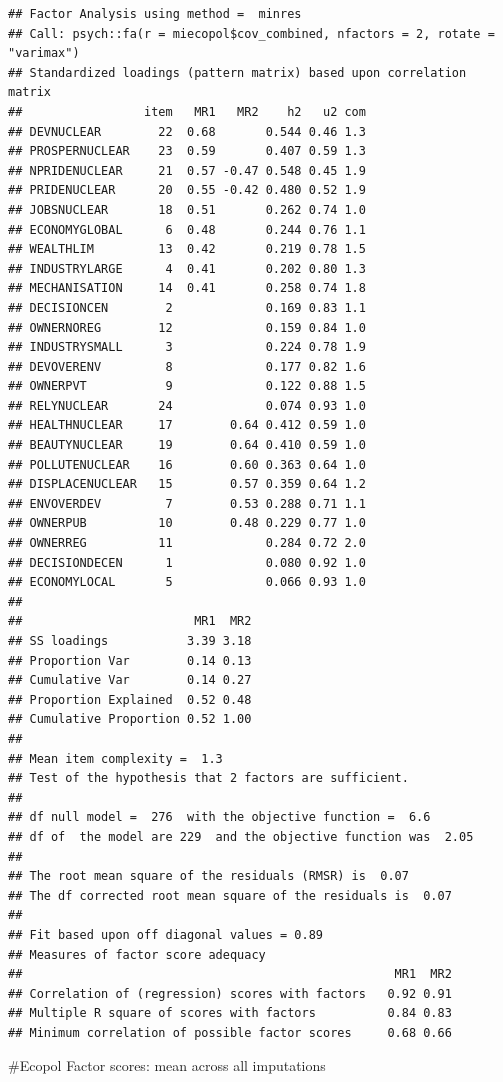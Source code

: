 \documentclass[
]{article}
\begin{document}
\begin{verbatim}
## Factor Analysis using method =  minres
## Call: psych::fa(r = miecopol$cov_combined, nfactors = 2, rotate = "varimax")
## Standardized loadings (pattern matrix) based upon correlation matrix
##                 item   MR1   MR2    h2   u2 com
## DEVNUCLEAR        22  0.68       0.544 0.46 1.3
## PROSPERNUCLEAR    23  0.59       0.407 0.59 1.3
## NPRIDENUCLEAR     21  0.57 -0.47 0.548 0.45 1.9
## PRIDENUCLEAR      20  0.55 -0.42 0.480 0.52 1.9
## JOBSNUCLEAR       18  0.51       0.262 0.74 1.0
## ECONOMYGLOBAL      6  0.48       0.244 0.76 1.1
## WEALTHLIM         13  0.42       0.219 0.78 1.5
## INDUSTRYLARGE      4  0.41       0.202 0.80 1.3
## MECHANISATION     14  0.41       0.258 0.74 1.8
## DECISIONCEN        2             0.169 0.83 1.1
## OWNERNOREG        12             0.159 0.84 1.0
## INDUSTRYSMALL      3             0.224 0.78 1.9
## DEVOVERENV         8             0.177 0.82 1.6
## OWNERPVT           9             0.122 0.88 1.5
## RELYNUCLEAR       24             0.074 0.93 1.0
## HEALTHNUCLEAR     17        0.64 0.412 0.59 1.0
## BEAUTYNUCLEAR     19        0.64 0.410 0.59 1.0
## POLLUTENUCLEAR    16        0.60 0.363 0.64 1.0
## DISPLACENUCLEAR   15        0.57 0.359 0.64 1.2
## ENVOVERDEV         7        0.53 0.288 0.71 1.1
## OWNERPUB          10        0.48 0.229 0.77 1.0
## OWNERREG          11             0.284 0.72 2.0
## DECISIONDECEN      1             0.080 0.92 1.0
## ECONOMYLOCAL       5             0.066 0.93 1.0
## 
##                        MR1  MR2
## SS loadings           3.39 3.18
## Proportion Var        0.14 0.13
## Cumulative Var        0.14 0.27
## Proportion Explained  0.52 0.48
## Cumulative Proportion 0.52 1.00
## 
## Mean item complexity =  1.3
## Test of the hypothesis that 2 factors are sufficient.
## 
## df null model =  276  with the objective function =  6.6
## df of  the model are 229  and the objective function was  2.05 
## 
## The root mean square of the residuals (RMSR) is  0.07 
## The df corrected root mean square of the residuals is  0.07 
## 
## Fit based upon off diagonal values = 0.89
## Measures of factor score adequacy             
##                                                    MR1  MR2
## Correlation of (regression) scores with factors   0.92 0.91
## Multiple R square of scores with factors          0.84 0.83
## Minimum correlation of possible factor scores     0.68 0.66
\end{verbatim}

\#Ecopol Factor scores: mean across all imputations
\end{document}
